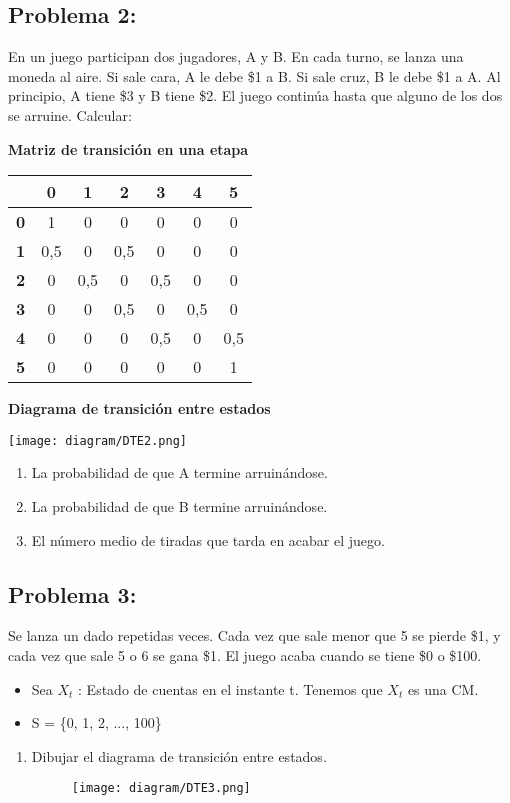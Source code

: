 \documentclass{templateNote}
\newcommand{\newparagraph}{\par\vspace{\baselineskip}\noindent}
\begin{document}
\newpage
\subsection{Problema 2:}
En un juego participan dos jugadores, A y B. En cada turno, se lanza una moneda al aire. Si sale cara, A le debe \$1 a B. Si sale cruz, B le debe \$1 a A. Al principio, A tiene \$3 y B tiene \$2. El juego contin\'ua hasta que alguno de los dos se arruine. Calcular:
\newparagraph
\textbf{Matriz de transici\'on en una etapa}
\begin{center}
    \begin{tabular}{g|c|c|c|c|c|c|}
         & \textbf{0} & \textbf{1} & \textbf{2} & \textbf{3} & \textbf{4} & \textbf{5} \\
        \hline
        \textbf{0} & 1 & 0 & 0 & 0 & 0 & 0 \\
        \hline
        \textbf{1} & 0,5 & 0 & 0,5 & 0 & 0 & 0 \\
        \hline
        \textbf{2} & 0 & 0,5 & 0 & 0,5 & 0 & 0 \\
        \hline
        \textbf{3} & 0 & 0 & 0,5 & 0 & 0,5 & 0 \\
        \hline
        \textbf{4} & 0 & 0 & 0 & 0,5 & 0 & 0,5 \\
        \hline
        \textbf{5} & 0 & 0 & 0 & 0 & 0 & 1 \\
        \hline
    \end{tabular}
\end{center}
\textbf{Diagrama de transici\'on entre estados}
\begin{center}
    \texttt{[image: diagram/DTE2.png]}
\end{center}
\begin{enumerate}
    \item La probabilidad de que A termine arruin\'andose.
    \item La probabilidad de que B termine arruin\'andose.
    \item El n\'umero medio de tiradas que tarda en acabar el juego.
\end{enumerate}

\newpage
\subsection{Problema 3:}
Se lanza un dado repetidas veces. Cada vez que sale menor que 5 se pierde \$1, y cada vez que sale 5 o 6 se gana \$1. El juego acaba cuando se tiene \$0 o \$100.
\begin{itemize}
    \item Sea $X_t$ : Estado de cuentas en el instante t. Tenemos que ${X_t}$ es una CM.
    \item S = \{0, 1, 2, ..., 100\}
\end{itemize}
\begin{enumerate}
    \item Dibujar el diagrama de transici\'on entre estados.
    \begin{figure}[H]
        \centering
        \texttt{[image: diagram/DTE3.png]}
    \end{figure}
\end{enumerate}
\end{document}
